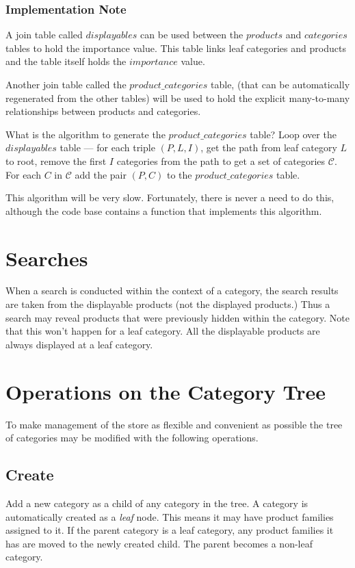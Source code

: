 \documentclass[letterpaper, 12pt]{article}
\begin{document}
\subsubsection{Implementation Note}
A join table called $displayables$ can be used between the $products$ and $categories$ tables to hold the importance value.  This table links leaf categories and products and the table itself holds the $importance$ value.
\par
Another join table called the $product\_categories$ table, (that can be automatically regenerated from the other tables) will be used to hold the explicit many-to-many relationships between products and categories.
\par
What is the algorithm to generate the $product\_categories$ table?  Loop over the $displayables$ table --- for each triple $(P, L, I)$, get the path from leaf category $L$ to root, remove the first $I$ categories from the path to get a set of categories $\mathscr{C}$.  For each $C$ in $\mathscr{C}$ add the pair $(P, C)$ to the $product\_categories$ table.
\par This algorithm will be very slow.  Fortunately, there is never a need to do this, although the code base contains a function that implements this algorithm.

\section{Searches}
When a search is conducted within the context of a category, the search results are taken from the displayable products (not the displayed products.)  Thus a search may reveal products that were previously hidden within the category.  Note that this won't happen for a leaf category.  All the displayable products are always displayed at a leaf category.

\section{Operations on the Category Tree}
To make management of the store as flexible and convenient as possible the tree of categories may be modified with the following operations.
\subsection{Create}
Add a new category as a child of any category in the tree.  A category is automatically created as a {\em leaf} node.  This means it may have product families assigned to it.  If the parent category is a leaf category, any product families it has are moved to the newly created child. The parent becomes a non-leaf category.
\end{document}
